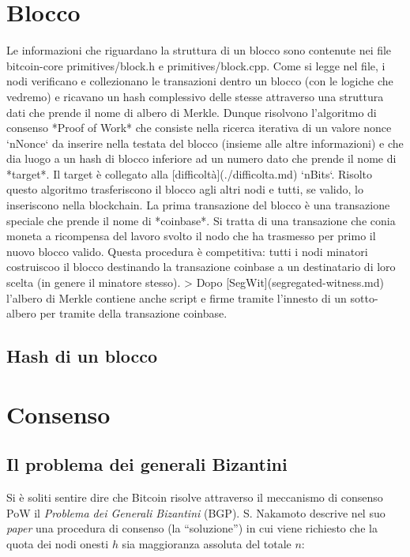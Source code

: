 \documentclass{book}
\theoremstyle{definition}
\begin{document}
\newpage
\section{Blocco}
Le informazioni che riguardano la struttura di un blocco sono contenute nei file bitcoin-core primitives/block.h e primitives/block.cpp.
Come si legge nel file, i nodi verificano e collezionano le transazioni dentro un blocco (con le logiche che vedremo) e ricavano un hash complessivo delle stesse attraverso una struttura dati che prende il nome di albero di Merkle.
Dunque risolvono l'algoritmo di consenso *Proof of Work* che consiste nella ricerca iterativa di un valore nonce `nNonce` da inserire nella testata del blocco (insieme alle altre informazioni) e che dia luogo a un hash di blocco inferiore ad un numero dato che prende il nome di *target*. Il target è collegato alla [difficoltà](./difficolta.md) `nBits`.
Risolto questo algoritmo trasferiscono il blocco agli altri nodi e tutti, se valido, lo inseriscono nella blockchain. La prima transazione del blocco è una transazione speciale che prende il nome di *coinbase*. Si tratta di una transazione che conia moneta a ricompensa del lavoro svolto il nodo che ha trasmesso per primo il nuovo blocco valido. Questa procedura è competitiva: tutti i nodi minatori costruiscoo il blocco destinando la transazione coinbase a un destinatario di loro scelta (in genere il minatore stesso).
> Dopo [SegWit](segregated-witness.md) l'albero di Merkle contiene anche script e firme tramite l'innesto di un sotto-albero per tramite della transazione coinbase.

\subsection{Hash di un blocco}

\newpage
\section{Consenso}\label{consenso}

\subsection{Il problema dei generali Bizantini}

Si è soliti sentire dire che Bitcoin risolve attraverso il meccanismo di consenso PoW
il \emph{Problema dei Generali Bizantini} \cite{lamport1982byzantine} (BGP). S. Nakamoto descrive nel suo \textit{paper} \cite{Nakamoto} una procedura di consenso (la ``soluzione'') 
in cui viene richiesto che la quota dei nodi onesti $h$ sia maggioranza assoluta del totale $n$:
\end{document}
